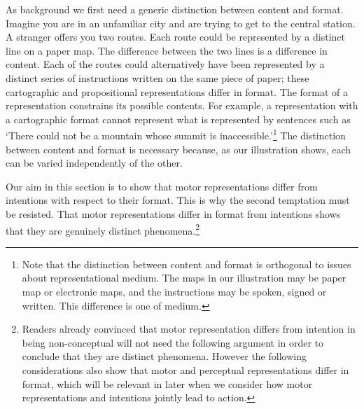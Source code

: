 \documentclass[12pt,\papersize]{extarticle}
\begin{document}
As background we first need a generic distinction between content and format. Imagine you are in an unfamiliar city and are trying to get to the central station. A stranger offers you two routes. Each route could be represented by a distinct line on a paper map. The difference between the two lines is a difference in content. Each of the routes could alternatively have been represented by a distinct series of instructions written on the same piece of paper; these cartographic and propositional representations differ in format. The format of a representation constrains its possible contents. For example, a representation with a cartographic format cannot represent what is represented by sentences such as `There could not be a mountain whose summit is inaccessible.'\footnote{ Note that the distinction between content and format is orthogonal to issues about representational medium. The maps in our illustration may be paper map or electronic maps, and the instructions may be spoken, signed or written. This difference is one of medium.} The distinction between content and format is necessary because, as our illustration shows, each can be varied independently of the other.

Our aim in this section is to show that motor representations differ from intentions with respect to their format. This is why the second temptation must be resisted. That motor representations differ in format from intentions shows that they are genuinely distinct phenomena.\footnote{ Readers already convinced that motor representation differs from intention in being non-conceptual will not need the following argument in order to conclude that they are distinct phenomena. However the following considerations also show that motor and perceptual representations differ in format, which will be relevant in later when we consider how motor representations and intentions jointly lead to action.}
\end{document}

